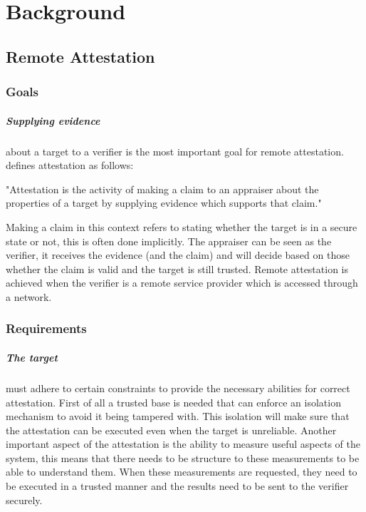\chapter{Background}

\section{Remote Attestation}

\subsection*{Goals}

\paragraph*{Supplying evidence} 
about a target to a verifier is the most important goal for remote attestation. \cite{CokerGeorge2011Pora} defines attestation as follows: \begin{displayquote} "Attestation is the activity of making a claim to an appraiser about the properties of a target by supplying evidence which supports that claim." \end{displayquote} Making a claim in this context refers to stating whether the target is in a secure state or not, this is often done implicitly. The appraiser can be seen as the verifier, it receives the evidence (and the claim) and will decide based on those whether the claim is valid and the target is still trusted. Remote attestation is achieved when the verifier is a remote service provider which is accessed through a network.

\subsection*{Requirements}

\paragraph*{The target}
must adhere to certain constraints to provide the necessary abilities for correct attestation. First of all a trusted base is needed that can enforce an isolation mechanism to avoid it being tampered with. This isolation will make sure that the attestation can be executed even when the target is unreliable. Another important aspect of the attestation is the ability to measure useful aspects of the system, this means that there needs to be structure to these measurements to be able to understand them. When these measurements are requested, they need to be executed in a trusted manner and the results need to be sent to the verifier securely.

